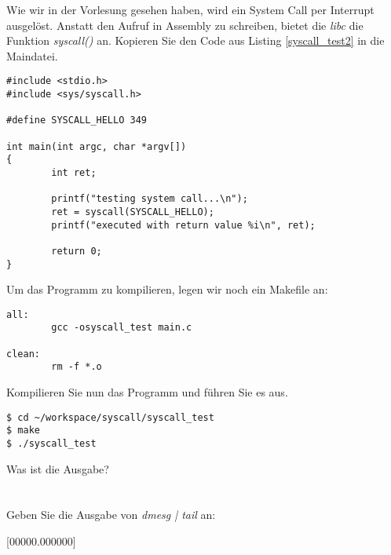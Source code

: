 Wie wir in der Vorlesung gesehen haben, wird ein System Call per Interrupt ausgelöst. Anstatt den Aufruf in Assembly zu schreiben, bietet
die \emph{libc} die Funktion \emph{syscall()} an. Kopieren Sie den Code aus Listing \ref{syscall_test2} in die Maindatei.

\begin{lstlisting}[label=syscall_test2,caption=workspace/syscall/main.c]
#include <stdio.h>
#include <sys/syscall.h>

#define SYSCALL_HELLO 349

int main(int argc, char *argv[])
{
        int ret;

        printf("testing system call...\n");
        ret = syscall(SYSCALL_HELLO);
        printf("executed with return value %i\n", ret);

        return 0;
}
\end{lstlisting} \hfill

Um das Programm zu kompilieren, legen wir noch ein Makefile an:
\begin{lstlisting}[caption=workspace/syscall/Makefile]
all:
        gcc -osyscall_test main.c

clean:
        rm -f *.o
\end{lstlisting}\hfill

Kompilieren Sie nun das Programm und führen Sie es aus.
\begin{lstlisting}
$ cd ~/workspace/syscall/syscall_test
$ make
$ ./syscall_test
\end{lstlisting} \hfill

Was ist die Ausgabe? \\

\underline{\smash{\textcolor{red}{testing system call...}}\hspace{0.54\textwidth}} \\
\underline{\smash{\textcolor{red}{executed with return value 0}}\hspace{0.45\textwidth}} \\

Geben Sie die Ausgabe von \emph{dmesg | tail} an:

[00000.000000] \underline{\hspace{0.5\textwidth}} \newline
[00000.000000] \underline{\hspace{0.5\textwidth}} \newline
[00000.000000] \underline{\hspace{0.5\textwidth}} \newline
[00000.000000] \underline{\hspace{0.5\textwidth}} \newline
[00000.000000] \underline{\hspace{0.5\textwidth}} \newline
[00000.000000] \underline{\hspace{0.5\textwidth}} \newline
[00000.000000] \underline{\smash{\textcolor{red}{Hello system call!}}\hspace{0.31\textwidth}} \newline

